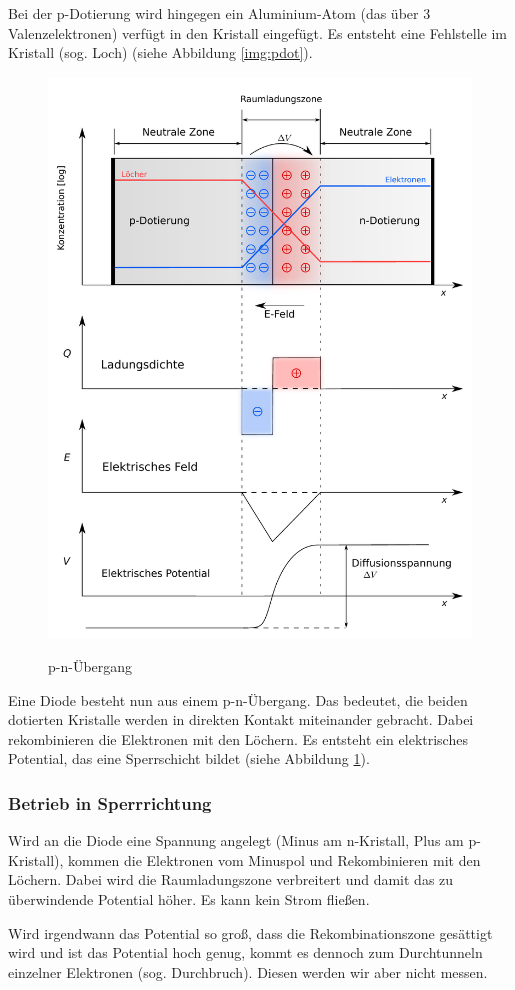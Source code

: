 Bei der p-Dotierung wird hingegen ein Aluminium-Atom (das über 3
Valenzelektronen) verfügt in den Kristall eingefügt. Es entsteht eine
Fehlstelle im Kristall (sog. Loch) (siehe Abbildung \ref{img:pdot}).

\begin{figure}[H]
  \centering
  \includegraphics[width=.6\textwidth]{pnjunct.pdf}
  \label{img:pnjunct}
  \caption{p-n-Übergang}
\end{figure}

Eine Diode besteht nun aus einem p-n-Übergang. Das bedeutet, die beiden
dotierten Kristalle werden in direkten Kontakt miteinander gebracht. Dabei
rekombinieren die Elektronen mit den Löchern. Es entsteht ein elektrisches
Potential, das eine Sperrschicht bildet (siehe Abbildung
\ref{img:pnjunct}).

\subsubsection{Betrieb in Sperrrichtung}

Wird an die Diode eine Spannung angelegt (Minus am n-Kristall, Plus am
p-Kristall), kommen die Elektronen vom Minuspol und Rekombinieren mit den
Löchern. Dabei wird die Raumladungszone verbreitert und damit das zu
überwindende Potential höher. Es kann kein Strom fließen.

Wird irgendwann das Potential so groß, dass die Rekombinationszone gesättigt
wird und ist das Potential hoch genug, kommt es dennoch zum Durchtunneln
einzelner Elektronen (sog. Durchbruch). Diesen werden wir aber nicht messen.

